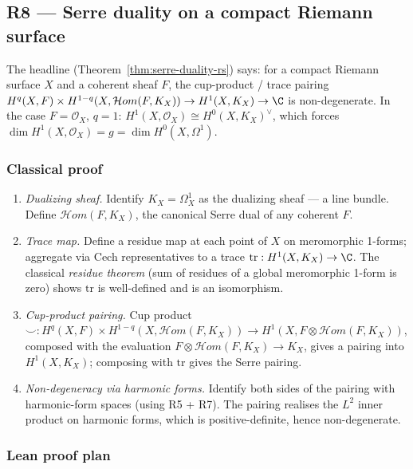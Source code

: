\subsection{R8 --- Serre duality on a compact Riemann surface}
\label{subsec:gap-R8-serre}

The headline (Theorem~\ref{thm:serre-duality-rs}) says: for a compact
Riemann surface \(X\) and a coherent sheaf \(F\), the cup-product /
trace pairing \(H^q(X, F) \times H^{1-q}(X, \mathcal{H}om(F, K_X))
\to H^1(X, K_X) \to \C\) is non-degenerate.  In the case \(F =
\mathcal{O}_X\), \(q = 1\): \(H^1(X, \mathcal{O}_X) \cong
H^0(X, K_X)^\vee\), which forces \(\dim H^1(X, \mathcal{O}_X) = g
= \dim H^0(X, \Omega^1)\).

\subsubsection*{Classical proof}

\begin{enumerate}
\item \emph{Dualizing sheaf.}  Identify \(K_X = \Omega^1_X\) as the
  dualizing sheaf --- a line bundle.  Define \(\mathcal{H}om(F, K_X)\),
  the canonical Serre dual of any coherent \(F\).
\item \emph{Trace map.}  Define a residue map at each point of \(X\)
  on meromorphic 1-forms; aggregate via Cech representatives to a
  trace \(\mathrm{tr} : H^1(X, K_X) \to \C\).  The classical
  \emph{residue theorem} (sum of residues of a global meromorphic
  1-form is zero) shows \(\mathrm{tr}\) is well-defined and is an
  isomorphism.
\item \emph{Cup-product pairing.}  Cup product
  \(\smile : H^q(X, F) \times H^{1-q}(X, \mathcal{H}om(F, K_X)) \to
  H^1(X, F \otimes \mathcal{H}om(F, K_X))\), composed with the
  evaluation \(F \otimes \mathcal{H}om(F, K_X) \to K_X\), gives a
  pairing into \(H^1(X, K_X)\); composing with \(\mathrm{tr}\) gives
  the Serre pairing.
\item \emph{Non-degeneracy via harmonic forms.}  Identify both
  sides of the pairing with harmonic-form spaces (using R5 + R7).
  The pairing realises the \(L^2\) inner product on harmonic forms,
  which is positive-definite, hence non-degenerate.
\end{enumerate}

\subsubsection*{Lean proof plan}

